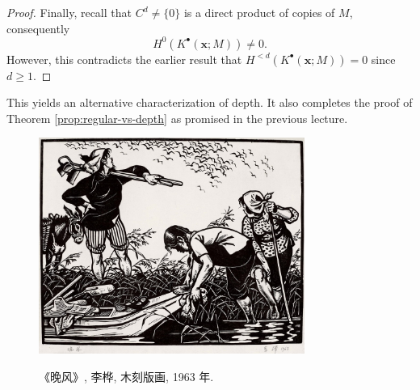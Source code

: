 \begin{proof}
	Finally, recall that $C^d \neq \{0\}$ is a direct product of copies of $M$, consequently
	\[ H^0(K^\bullet(\mathbf{x}; M)) \neq 0. \]
	However, this contradicts the earlier result that $H^{<d}(K^\bullet(\mathbf{x}; M))=0$ since $d \geq 1$.
\end{proof}

This yields an alternative characterization of depth. It also completes the proof of Theorem \ref{prop:regular-vs-depth} as promised in the previous lecture.

\vfill
\begin{figure}[h]
	\centering \includegraphics[height=200pt]{WanFeng.jpg} \\ \vspace{1em}
	\begin{minipage}{0.7\textwidth}\begin{center}
			\small {} 《晚风》, 李桦, 木刻版画, 1963 年.
	\end{center}\end{minipage}
\end{figure}
\vfill